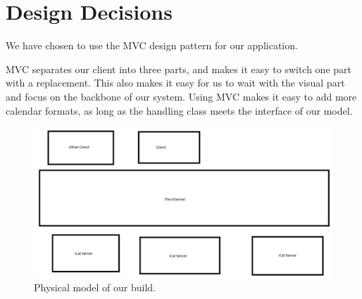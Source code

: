 \section{Design Decisions}
We have chosen to use the MVC design pattern for our \CS application.

MVC separates our client into three parts, and makes it easy to switch one part with a replacement. This also makes it easy for us to wait with the visual part and focus on the backbone of our system.
Using MVC makes it easy to add more calendar formats, as long as the handling class meets the interface of our model.

\begin{figure}[h!]
  \includegraphics[width=\textwidth,natwidth=1109,natheight=559]{illustrations/PhysicalModel.png}
  \caption{Physical model of our build.}
\end{figure}

\newpage